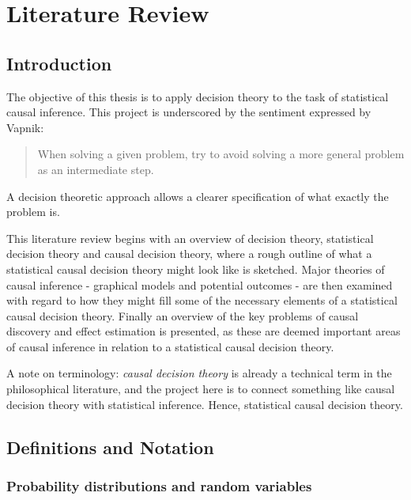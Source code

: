 
\section{Literature Review}

\subsection{Introduction}

The objective of this thesis is to apply decision theory to the task of statistical causal inference.  This project is underscored by the sentiment expressed by Vapnik\cite{vapnik_nature_2013}:

\begin{quote}
    When solving a given problem, try to avoid solving a more general problem as an intermediate step.
\end{quote}

A decision theoretic approach allows a clearer specification of what exactly the problem is.

This literature review begins with an overview of decision theory, statistical decision theory and causal decision theory, where a rough outline of what a statistical causal decision theory might look like is sketched. Major theories of causal inference - graphical models and potential outcomes - are then examined with regard to how they might fill some of the necessary elements of a statistical causal decision theory. Finally an overview of the key problems of causal discovery and effect estimation is presented, as these are deemed important areas of causal inference in relation to a statistical causal decision theory.

A note on terminology: \emph{causal decision theory} is already a technical term in the philosophical literature, and the project here is to connect something like causal decision theory with statistical inference. Hence, statistical causal decision theory.


\subsection{Definitions and Notation}

\subsubsection{Probability distributions and random variables}

